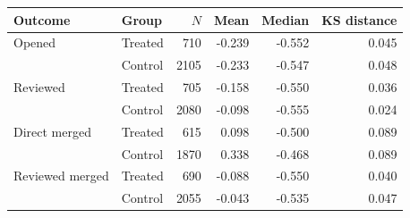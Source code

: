 \small
\begin{tabular}{llrrrr}
\toprule
Outcome & Group & $N$ & Mean & Median & KS distance \\
\midrule
Opened & Treated & 710 & -0.239 & -0.552 & 0.045 \\
       & Control & 2105 & -0.233 & -0.547 & 0.048 \\
Reviewed & Treated & 705 & -0.158 & -0.550 & 0.036 \\
         & Control & 2080 & -0.098 & -0.555 & 0.024 \\
Direct merged & Treated & 615 & 0.098 & -0.500 & 0.089 \\
              & Control & 1870 & 0.338 & -0.468 & 0.089 \\
Reviewed merged & Treated & 690 & -0.088 & -0.550 & 0.040 \\
                & Control & 2055 & -0.043 & -0.535 & 0.047 \\
\bottomrule
\end{tabular}
